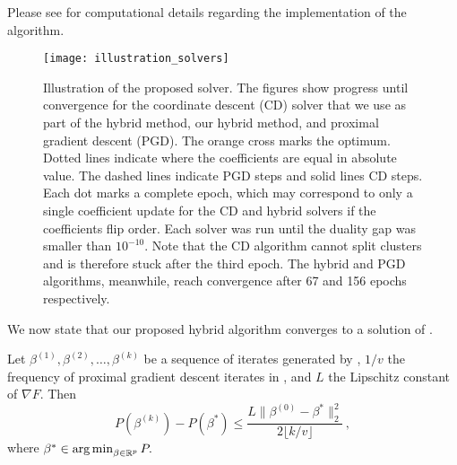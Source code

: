 Please see  for computational details regarding the implementation of the algorithm.

\begin{figure*}[htb]
  \centering
  \texttt{[image: illustration\_solvers]}
  \caption{Illustration of the proposed solver. The figures show progress
    until convergence for the coordinate descent (CD) solver that we use as part
    of the hybrid method, our hybrid method, and  proximal gradient descent
    (PGD). The orange cross marks the optimum. Dotted lines indicate where the
    coefficients are equal in absolute value. The dashed lines indicate PGD
    steps and solid lines CD steps. Each dot marks a complete epoch, which may
    correspond to only a single coefficient update for the CD and hybrid
    solvers if the coefficients flip order. Each solver was run until the duality
    gap was smaller than \(10^{-10}\). Note that the CD algorithm cannot split clusters
    and is therefore stuck after the third epoch. The hybrid and PGD algorithms,
    meanwhile, reach convergence after 67 and 156 epochs respectively.}
  \label{fig:illustration-solver}
\end{figure*}

We now state that our proposed hybrid algorithm converges to a solution of .

\begin{lemma}
  \label{lem:convergence}
  Let \(\beta^{(1)}, \beta^{(2)}, \dots, \beta^{(k)}\) be a sequence of
  iterates generated by , \(1/v\) the frequency of proximal gradient
  descent iterates in , and \(L\) the Lipschitz constant of
  \(\nabla F\). Then
  \[
    P(\beta^{(k)}) - P(\beta^*) \leq \frac{L \lVert \beta^{(0)} - \beta^* \rVert_2^2}{2\lfloor k/v \rfloor }\, ,
  \]
  where \(\beta^* \in \operatorname*{arg\,min}_{\beta \in \mathbb{R}^p} P.\)
\end{lemma}

